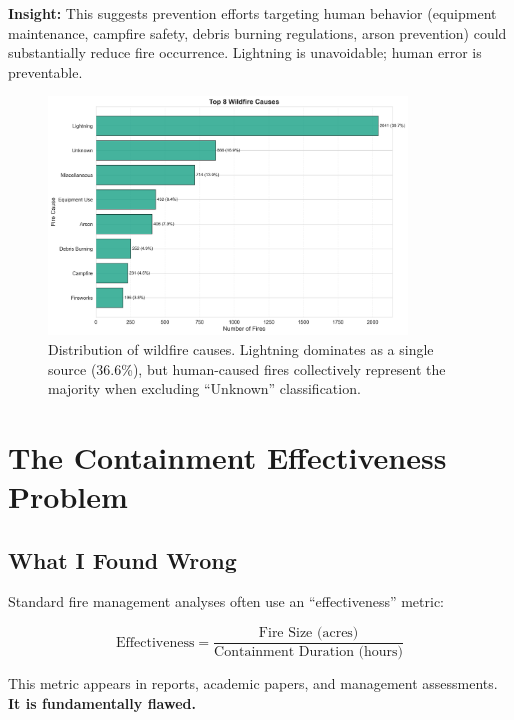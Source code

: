 \documentclass[11pt,a4paper]{article}
\begin{document}
\begin{tcolorbox}[colback=infocolor!10!white, colframe=infocolor]
\textbf{Insight:} This suggests prevention efforts targeting human behavior (equipment maintenance, campfire safety, debris burning regulations, arson prevention) could substantially reduce fire occurrence. Lightning is unavoidable; human error is preventable.
\end{tcolorbox}

\begin{figure}[h]
\centering
\includegraphics[width=0.85\textwidth]{cause_distribution.png}
\caption{Distribution of wildfire causes. Lightning dominates as a single source (36.6\%), but human-caused fires collectively represent the majority when excluding ``Unknown'' classification.}
\label{fig:causes}
\end{figure}

\section{The Containment Effectiveness Problem}

\subsection{What I Found Wrong}

Standard fire management analyses often use an ``effectiveness'' metric:

\begin{equation}
\text{Effectiveness} = \frac{\text{Fire Size (acres)}}{\text{Containment Duration (hours)}}
\end{equation}

This metric appears in reports, academic papers, and management assessments. \textbf{It is fundamentally flawed.}
\end{document}
